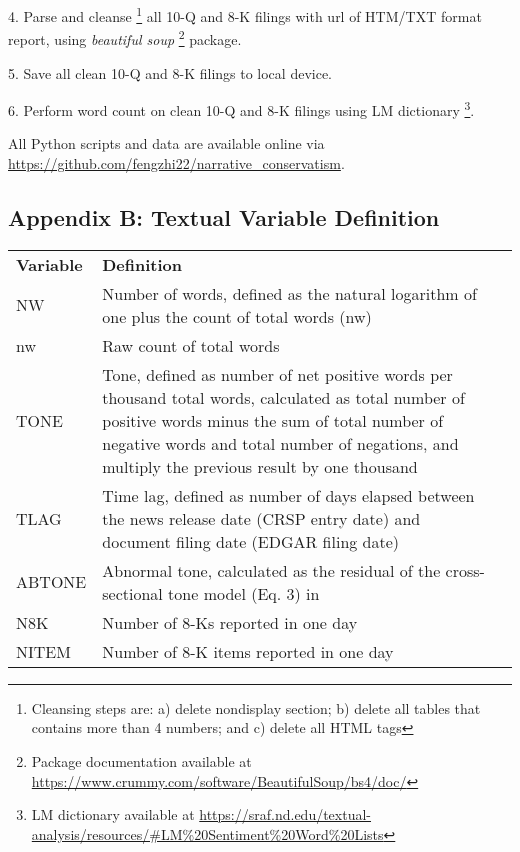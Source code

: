 4. Parse and cleanse \footnote{Cleansing steps are: a) delete nondisplay section; b) delete all tables that contains more than 4 numbers; and c) delete all HTML tags} all 10-Q and 8-K filings with url of HTM/TXT format report, using \textit{beautiful soup} \footnote{Package documentation available at \url{https://www.crummy.com/software/BeautifulSoup/bs4/doc/}} package. 

5. Save all clean 10-Q and 8-K filings to local device. 

6. Perform word count on clean 10-Q and 8-K filings using LM dictionary \footnote{LM dictionary available at \url{https://sraf.nd.edu/textual-analysis/resources/\#LM\%20Sentiment\%20Word\%20Lists}}. 

All Python scripts and data are available online via \url{https://github.com/fengzhi22/narrative_conservatism}.

\subsection*{Appendix B: Textual Variable Definition}
\label{appb}
\begin{table}[H]
	\centering
	\begin{tabular}{lp{15cm}p{15cm}}
		\textbf{Variable} & \textbf{Definition} \\
		NW & Number of words, defined as the natural logarithm of one plus the count of total words (nw)\\
		nw & Raw count of total words\\
		TONE & Tone, defined as number of net positive words per thousand total words, calculated as total number of positive words minus the sum of total number of negative words and total number of negations, and multiply the previous result by one thousand\\
		TLAG & Time lag, defined as number of days elapsed between the news release date (CRSP entry date) and document filing date (EDGAR filing date)\\
		ABTONE & Abnormal tone, calculated as the residual of the cross-sectional tone model (Eq. 3) in \cite{huangToneManagement2014}\\
		N8K & Number of 8-Ks reported in one day\\
		NITEM & Number of 8-K items reported in one day\\
		
	\end{tabular}%
\end{table}%

